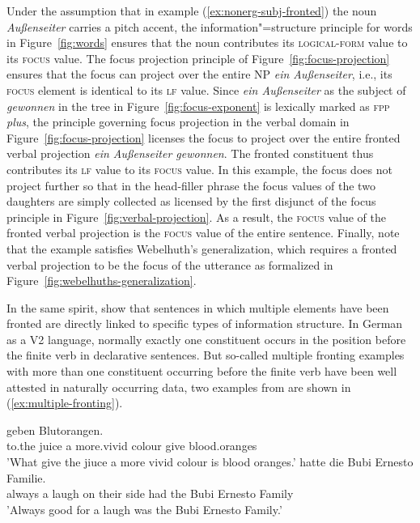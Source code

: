 \documentclass[output=paper]{langsci/langscibook}
\begin{document}
Under the assumption that in example (\ref{ex:nonerg-subj-fronted}) the
noun \textit{Außenseiter} carries a pitch accent, the
information"=structure principle for words in Figure~\ref{fig:words} ensures that the noun
contributes its \textsc{logical-form} value to its \textsc{focus}
value. The focus projection principle of
Figure~\ref{fig:focus-projection} ensures that the focus can
project over the entire NP \textit{ein Außenseiter}, i.e., its
\textsc{focus} element is identical to its \textsc{lf} value. Since
\textit{ein Außenseiter} as the subject of \textit{gewonnen} in the
tree in Figure~\ref{fig:focus-exponent} is lexically marked as
\textsc{fpp} \textit{plus}, the principle governing focus projection
in the verbal domain in Figure~\ref{fig:focus-projection}
licenses the focus to project over the entire fronted verbal
projection \textit{ein Außenseiter gewonnen}. The fronted constituent
thus contributes its \textsc{lf} value to its \textsc{focus} value. In
this example, the focus does not project further so that in the
head-filler phrase the focus values of the two daughters are simply
collected as licensed by the first disjunct of the focus principle in
Figure~\ref{fig:verbal-projection}. As a result, the
\textsc{focus} value of the fronted verbal projection is the
\textsc{focus} value of the entire sentence. Finally, note that the
example satisfies Webelhuth's generalization, which requires a fronted
verbal projection to be the focus of the utterance as formalized in
Figure~\ref{fig:webelhuths-generalization}.

In the same spirit, \cite{BC2010a} show that sentences in which
multiple elements have been fronted are directly linked to specific
types of information structure. In German as a V2 language, normally
exactly one constituent occurs in the position before the finite verb
in declarative sentences. But so-called multiple fronting examples
with more than one constituent occurring before the finite verb have
been well attested in naturally occurring data, two examples from
\cite{BC2010a} are shown in (\ref{ex:multiple-fronting}).
\begin{exe}
  \ex\label{ex:multiple-fronting}
  \begin{xlist}
    \ex{} geben Blutorangen.\\
             to.the juice a more.vivid colour give blood.oranges\\
      \trans 'What give the jiuce a more vivid colour is blood oranges.'
    \ex{} hatte die Bubi Ernesto Familie.\\
            always a laugh on their side had the Bubi Ernesto Family\\
        \trans 'Always good for a laugh was the Bubi Ernesto Family.'
  \end{xlist}

\end{exe}
\end{document}
